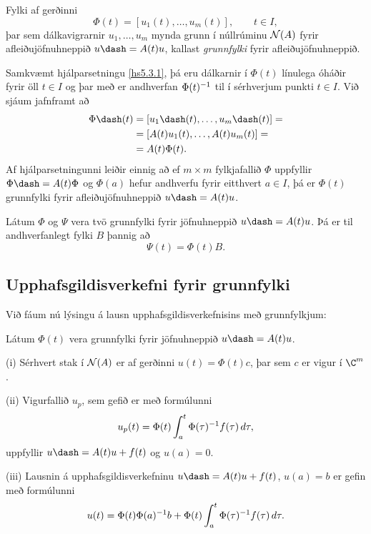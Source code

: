 \begin{sk} Fylki af gerðinni
$$ \Phi(t)=[u_1(t),\dots,u_m(t)], \qquad t\in I, $$ 
þar sem dálkavigrarnir $u_1,\dots,u_m$ mynda grunn í núllrúminu ${\cal
N}(A)$ fyrir afleiðujöfnuhneppið $u\dash=A(t)u$, kallast
{\it grunnfylki} fyrir afleiðujöfnuhneppið.
\end{sk}

Samkvæmt hjálparsetningu \ref{hs5.3.1}, þá eru dálkarnir í $\Phi(t)$
línulega óháðir fyrir öll $t\in I$ og þar með er andhverfan
$\Phi(t)\sp{-1}$ til í sérhverjum punkti $t\in I$.  Við sjáum
jafnframt að
\begin{align*}
\Phi\dash(t)&= [u_1\dash(t),\dots,u_m\dash(t)]=\nonumber\\
&=[A(t)u_1(t),\dots,A(t)u_m(t)]=\label{5.3.1}\\
&=A(t)\Phi(t).\nonumber
\end{align*}
Af hjálparsetningunni leiðir einnig að ef $m\times
m$ fylkjafallið $\Phi$ uppfyllir $\Phi\dash=A(t)\Phi$ og $\Phi(a)$
hefur andhverfu fyrir eitthvert $a\in I$, þá er $\Phi(t)$ grunnfylki
fyrir afleiðujöfnuhneppið $u\dash =A(t)u$.

\begin{se}
Látum $\Phi$ og $\Psi$ vera tvö grunnfylki fyrir jöfnuhneppið
$u\dash=A(t)u$. Þá er til andhverfanlegt fylki $B$ þannig að 
 \begin{equation*}\Psi(t)=\Phi(t)B.\label{5.3.2}
 \end{equation*}
\end{se}


\subsection*{Upphafsgildisverkefni fyrir grunnfylki}

\noindent
Við fáum nú lýsingu á lausn upphafsgildisverkefnisins með
grunnfylkjum:

\begin{se}\label{set5.3.4}
 Látum $\Phi(t)$ vera grunnfylki fyrir jöfnuhneppið $u\dash
=A(t)u$. 

\noindent
(i)  Sérhvert stak í ${\cal N}(A)$ er af gerðinni $u(t)=\Phi(t)c$, þar
sem $c$ er vigur í $\C\sp m$.

\noindent
(ii) Vigurfallið  $u_p$, sem gefið er með formúlunni
 $$u_p(t)=\Phi(t)\int_a\sp t \Phi(\tau)\sp{-1}f(\tau)\, d\tau,
 $$
uppfyllir $u\dash=A(t)u+f(t)$ og $u(a)=0$. 

\noindent
(iii)  Lausnin á upphafsgildisverkefninu $u\dash=A(t)u+f(t)$, $u(a)=b$
er gefin með formúlunni
 $$u(t)=\Phi(t)\Phi(a)\sp{-1}b+
\Phi(t)\int_a\sp t \Phi(\tau)\sp{-1}f(\tau)\, d\tau.
 $$
\end{se}

